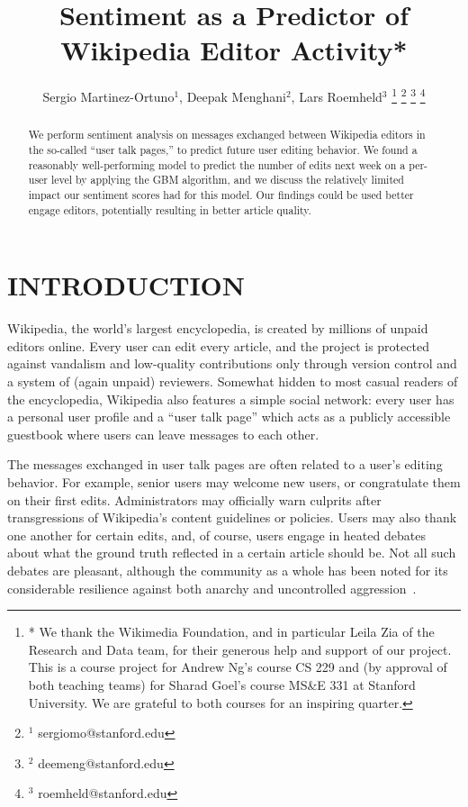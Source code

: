 \documentclass[letterpaper, 10 pt, conference]{ieeeconf}  %
\title{\LARGE \bf
Sentiment as a Predictor of Wikipedia Editor Activity*
}
\author{Sergio Martinez-Ortuno$^{1}$, Deepak Menghani$^{2}$, Lars Roemheld$^{3}$%
\thanks{* We thank the Wikimedia Foundation, and in particular Leila Zia of the Research and Data team, for their generous help and support of our project. This is a course project for Andrew Ng's course CS 229 and (by approval of both teaching teams) for Sharad Goel's course MS\&E 331 at Stanford University. We are grateful to both courses for an inspiring quarter.}%
\thanks{$^{1}$ sergiomo@stanford.edu}%
\thanks{$^{2}$ deemeng@stanford.edu}%
\thanks{$^{3}$ roemheld@stanford.edu}%
}
\begin{document}
\maketitle
\thispagestyle{empty}
\pagestyle{empty}


\begin{abstract}

We perform sentiment analysis on messages exchanged between Wikipedia editors in the so-called ``user talk pages,'' to predict future user editing behavior. We found a reasonably well-performing model to predict the number of edits next week on a per-user level by applying the GBM algorithm, and we discuss the relatively limited impact our sentiment scores had for this model. Our findings could be used better engage editors, potentially resulting in better article quality.

\end{abstract}


\section{INTRODUCTION}

Wikipedia, the world’s largest encyclopedia, is created by millions of unpaid editors online. Every user can edit every article, and the project is protected against vandalism and low-quality contributions only through version control and a system of (again unpaid) reviewers. Somewhat hidden to most casual readers of the encyclopedia, Wikipedia also features a simple social network: every user has a personal user profile and a ``user talk page'' which acts as a publicly accessible guestbook where users can leave messages to each other. 

The messages exchanged in user talk pages are often related to a user's editing behavior. For example, senior users may welcome new users, or congratulate them on their first edits. Administrators may officially warn culprits after transgressions of Wikipedia’s content guidelines or policies. Users may also thank one another for certain edits, and, of course, users engage in heated debates about what the ground truth reflected in a certain article should be. Not all such debates are pleasant, although the community as a whole has been noted for its considerable resilience against both anarchy and uncontrolled aggression~\cite{c1, c2, c3}.
\end{document}

